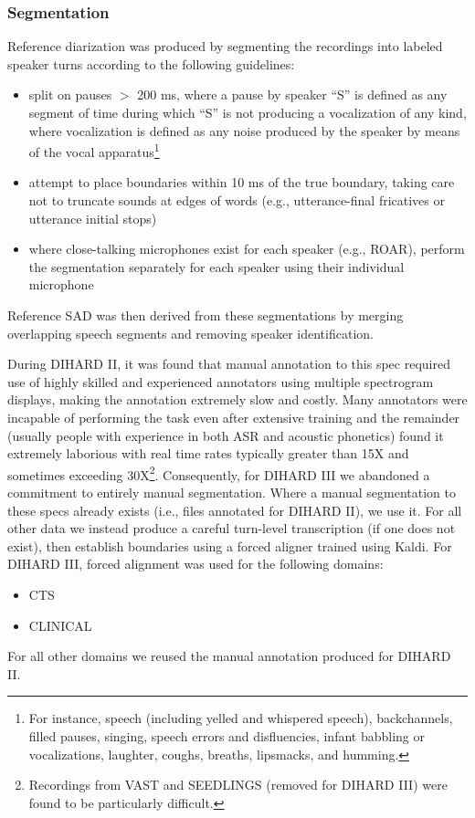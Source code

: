 \documentclass{article}
\begin{document}
\subsubsection{Segmentation}
\label{sec:single_track_segmentation}
Reference diarization was produced by segmenting the recordings into labeled speaker turns according to the following guidelines:
\begin{itemize}
    \item split on pauses $>$ 200 ms, where a pause by speaker ``S'' is defined as any segment of time during which ``S'' is not producing a vocalization of any kind, where vocalization is defined as any noise produced by the speaker by means of the vocal apparatus\footnote{For instance, speech (including yelled and whispered speech), backchannels, filled pauses, singing, speech errors and disfluencies, infant babbling or vocalizations, laughter, coughs, breaths, lipsmacks, and humming.}
    \item attempt to place boundaries within 10 ms of the true boundary, taking care not to truncate sounds at edges of words (e.g., utterance-final fricatives or utterance initial stops)
    \item where close-talking microphones exist for each speaker (e.g., ROAR), perform the segmentation separately for each speaker using their individual microphone
\end{itemize}
Reference SAD was then derived from these segmentations by merging overlapping speech segments and removing speaker identification.

During DIHARD II, it was found that manual annotation to this spec required use of highly skilled and experienced annotators using multiple spectrogram displays, making the annotation extremely slow and costly. Many annotators were incapable of performing the task even after extensive training and the remainder (usually people with experience in both ASR and acoustic phonetics) found it extremely laborious with real time rates typically greater than 15X and sometimes exceeding 30X\footnote{Recordings from VAST and SEEDLINGS (removed for DIHARD III) were found to be particularly difficult.}. Consequently, for DIHARD III we abandoned a commitment to entirely manual segmentation. Where a manual segmentation to these specs already exists (i.e., files annotated for DIHARD II), we use it. For all other data we instead produce a careful turn-level transcription (if one does not exist), then establish boundaries using a forced aligner trained using Kaldi. For DIHARD III, forced alignment was used for the following domains:
\begin{itemize}
    \item CTS
    \item CLINICAL
\end{itemize}
For all other domains we reused the manual annotation produced for DIHARD II.
\end{document}
